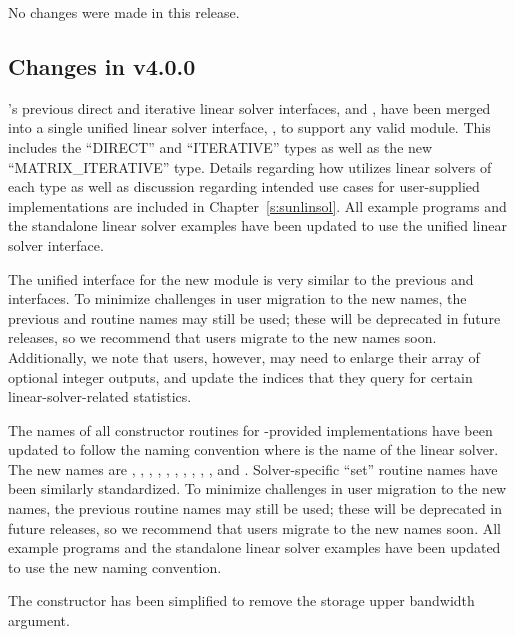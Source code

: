 No changes were made in this release.

\subsection*{Changes in v4.0.0}

{\kinsol}'s previous direct and iterative linear solver interfaces,
{\kindls} and {\kinspils}, have been merged into a single unified linear
solver interface, {\kinls}, to support any valid {\sunlinsol} module.
This includes the ``DIRECT'' and ``ITERATIVE'' types as well as the new
``MATRIX\_ITERATIVE'' type. Details regarding how {\kinls} utilizes linear
solvers of each type as well as discussion regarding intended use cases for
user-supplied {\sunlinsol} implementations are included in
Chapter~\ref{s:sunlinsol}. All {\kinsol} example programs and the standalone
linear solver examples have been updated to use the unified linear solver
interface.

The unified interface for the new {\kinls} module is very similar to the
previous {\kindls} and {\kinspils} interfaces. To minimize challenges in user
migration to the new names, the previous {\CC} and {\F} routine names may still
be used; these will be deprecated in future releases, so we recommend that users
migrate to the new names soon. Additionally, we note that {\F} users, however,
may need to enlarge their  array of optional integer outputs, and
update the indices that they query for certain linear-solver-related
statistics.

The names of all constructor routines for {\sundials}-provided
{\sunlinsol} implementations have been updated to follow the naming convention
 where \id{*} is the name of the linear solver. The new names
are
,
,
,
,\newline
{},
,
,
,
,
, and
.  Solver-specific ``set'' routine names have
been similarly standardized.  To minimize challenges in user migration
to the new names, the previous routine names may still be used; these
will be deprecated in future releases, so we recommend that users
migrate to the new names soon. All {\kinsol} example programs and the standalone
linear solver examples have been updated to use the new naming convention.

The  constructor has been simplified to remove the
storage upper bandwidth argument.

